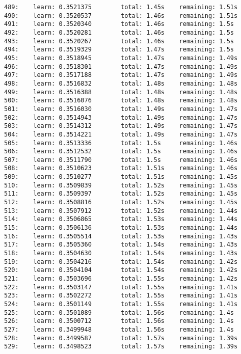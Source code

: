 \documentclass[11pt]{article}
\begin{document}
\begin{Verbatim}[commandchars=\\\{\}]
489:    learn: 0.3521375        total: 1.45s    remaining: 1.51s
490:    learn: 0.3520537        total: 1.46s    remaining: 1.51s
491:    learn: 0.3520340        total: 1.46s    remaining: 1.5s
492:    learn: 0.3520281        total: 1.46s    remaining: 1.5s
493:    learn: 0.3520267        total: 1.46s    remaining: 1.5s
494:    learn: 0.3519329        total: 1.47s    remaining: 1.5s
495:    learn: 0.3518945        total: 1.47s    remaining: 1.49s
496:    learn: 0.3518301        total: 1.47s    remaining: 1.49s
497:    learn: 0.3517188        total: 1.47s    remaining: 1.49s
498:    learn: 0.3516832        total: 1.48s    remaining: 1.48s
499:    learn: 0.3516388        total: 1.48s    remaining: 1.48s
500:    learn: 0.3516076        total: 1.48s    remaining: 1.48s
501:    learn: 0.3516030        total: 1.49s    remaining: 1.47s
502:    learn: 0.3514943        total: 1.49s    remaining: 1.47s
503:    learn: 0.3514312        total: 1.49s    remaining: 1.47s
504:    learn: 0.3514221        total: 1.49s    remaining: 1.47s
505:    learn: 0.3513336        total: 1.5s     remaining: 1.46s
506:    learn: 0.3512532        total: 1.5s     remaining: 1.46s
507:    learn: 0.3511790        total: 1.5s     remaining: 1.46s
508:    learn: 0.3510623        total: 1.51s    remaining: 1.46s
509:    learn: 0.3510277        total: 1.51s    remaining: 1.45s
510:    learn: 0.3509839        total: 1.52s    remaining: 1.45s
511:    learn: 0.3509397        total: 1.52s    remaining: 1.45s
512:    learn: 0.3508816        total: 1.52s    remaining: 1.45s
513:    learn: 0.3507912        total: 1.52s    remaining: 1.44s
514:    learn: 0.3506865        total: 1.53s    remaining: 1.44s
515:    learn: 0.3506136        total: 1.53s    remaining: 1.44s
516:    learn: 0.3505514        total: 1.53s    remaining: 1.43s
517:    learn: 0.3505360        total: 1.54s    remaining: 1.43s
518:    learn: 0.3504630        total: 1.54s    remaining: 1.43s
519:    learn: 0.3504216        total: 1.54s    remaining: 1.42s
520:    learn: 0.3504104        total: 1.54s    remaining: 1.42s
521:    learn: 0.3503696        total: 1.55s    remaining: 1.42s
522:    learn: 0.3503147        total: 1.55s    remaining: 1.41s
523:    learn: 0.3502272        total: 1.55s    remaining: 1.41s
524:    learn: 0.3501149        total: 1.55s    remaining: 1.41s
525:    learn: 0.3501089        total: 1.56s    remaining: 1.4s
526:    learn: 0.3500712        total: 1.56s    remaining: 1.4s
527:    learn: 0.3499948        total: 1.56s    remaining: 1.4s
528:    learn: 0.3499587        total: 1.57s    remaining: 1.39s
529:    learn: 0.3498523        total: 1.57s    remaining: 1.39s

\end{Verbatim}
\end{document}
